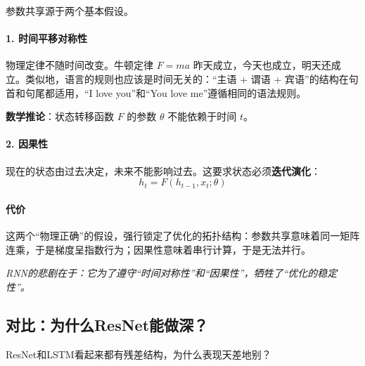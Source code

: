 参数共享源于两个基本假设。

\paragraph{1. 时间平移对称性}

物理定律不随时间改变。牛顿定律 $F = ma$ 昨天成立，今天也成立，明天还成立。类似地，语言的规则也应该是时间无关的：“主语 + 谓语 + 宾语”的结构在句首和句尾都适用，“I love you”和“You love me”遵循相同的语法规则。

\textbf{数学推论}：状态转移函数 $F$ 的参数 $\theta$ 不能依赖于时间 $t$。

\paragraph{2. 因果性}

现在的状态由过去决定，未来不能影响过去。这要求状态必须\textbf{迭代演化}：
\begin{equation}
    h_t = F(h_{t-1}, x_t; \theta)
\end{equation}

\paragraph{代价}

这两个“物理正确”的假设，强行锁定了优化的拓扑结构：参数共享意味着同一矩阵连乘，于是梯度呈指数行为；因果性意味着串行计算，于是无法并行。

\begin{center}
\textit{RNN的悲剧在于：它为了遵守“时间对称性”和“因果性”，牺牲了“优化的稳定性”。}
\end{center}

\subsection{对比：为什么ResNet能做深？}


ResNet和LSTM看起来都有残差结构，为什么表现天差地别？

